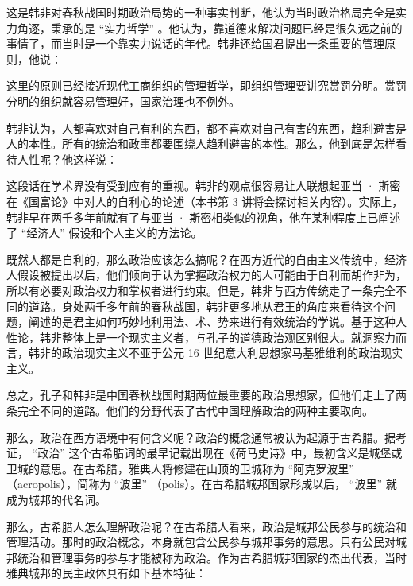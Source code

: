 
这是韩非对春秋战国时期政治局势的一种事实判断，他认为当时政治格局完全是实力角逐，秉承的是 “实力哲学” 。他认为，靠道德来解决问题已经是很久远之前的事情了，而当时是一个靠实力说话的年代。韩非还给国君提出一条重要的管理原则，他说：


这里的原则已经接近现代工商组织的管理哲学，即组织管理要讲究赏罚分明。赏罚分明的组织就容易管理好，国家治理也不例外。

韩非认为，人都喜欢对自己有利的东西，都不喜欢对自己有害的东西，趋利避害是人的本性。所有的统治和政事都要围绕人趋利避害的本性。那么，他到底是怎样看待人性呢？他这样说：


这段话在学术界没有受到应有的重视。韩非的观点很容易让人联想起亚当 · 斯密在《国富论》中对人的自利心的论述（本书第 3 讲将会探讨相关内容）。实际上，韩非早在两千多年前就有了与亚当 · 斯密相类似的视角，他在某种程度上已阐述了 “经济人” 假设和个人主义的方法论。

既然人都是自利的，那么政治应该怎么搞呢？在西方近代的自由主义传统中，经济人假设被提出以后，他们倾向于认为掌握政治权力的人可能由于自利而胡作非为，所以有必要对政治权力和掌权者进行约束。但是，韩非与西方传统走了一条完全不同的道路。身处两千多年前的春秋战国，韩非更多地从君王的角度来看待这个问题，阐述的是君主如何巧妙地利用法、术、势来进行有效统治的学说。基于这种人性论，韩非整体上是一个现实主义者，与孔子的道德政治观区别很大。就洞察力而言，韩非的政治现实主义不亚于公元 16 世纪意大利思想家马基雅维利的政治现实主义。

总之，孔子和韩非是中国春秋战国时期两位最重要的政治思想家，但他们走上了两条完全不同的道路。他们的分野代表了古代中国理解政治的两种主要取向。


那么，政治在西方语境中有何含义呢？政治的概念通常被认为起源于古希腊。据考证， “政治” 这个古希腊词的最早记载出现在《荷马史诗》中，最初含义是城堡或卫城的意思。在古希腊，雅典人将修建在山顶的卫城称为 “阿克罗波里” （acropolis），简称为 “波里” （polis）。在古希腊城邦国家形成以后， “波里” 就成为城邦的代名词。

那么，古希腊人怎么理解政治呢？在古希腊人看来，政治是城邦公民参与的统治和管理活动。那时的政治概念，本身就包含公民参与城邦事务的意思。只有公民对城邦统治和管理事务的参与才能被称为政治。作为古希腊城邦国家的杰出代表，当时雅典城邦的民主政体具有如下基本特征：

